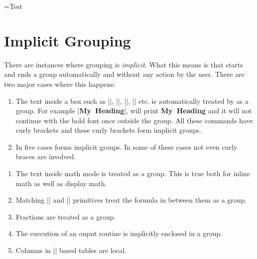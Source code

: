\newbox\MyBox

\setbox\MyBox=\hbox{\hfil Test\hfill}

\unhbox\MyBox


\noindent\unhbox\MyBox






\section{Implicit Grouping}

There are  instances where grouping is \textit{implicit}. What this means is that \text starts and ends a group automatically and without any action by the user. There are two major cases where this happens:

\begin{enumerate}
\item The text inside a box such as |\hbox|, |\vbox|, |\vtop|, |\vcenter| etc. is automatically treated by \tex as a group.  For example |\hbox{\bf My Heading}|, will print  \hbox{\bf My Heading}  and it will not continue with the bold font once outside the group. All these commands have curly brackets and these curly brackets form implicit groups.
\item In five cases \tex forms implicit groups. In some of these cases not even curly braces are involved.
\end{enumerate}

\begin{enumerate}
\item The text inside math mode is treated as a group. This is true both for inline math as well as display math.
\item Matching |\left| and |\right| primitives treat the formula in between them as a group.
\item Fractions are treated as a group.
\item The execution of an ouput routine is implicitly enclosed in a group.
\item Columns in |\halign| based tables are local.
\end{enumerate} 

